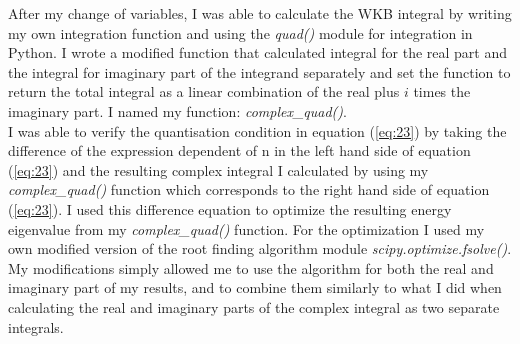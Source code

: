 \documentclass[10pt, a4paper, singlespacing, headsepline]{report}
\begin{document}
After my change of variables, I was able to calculate the WKB integral by writing my own integration function and using the \emph{quad()} module for integration in Python. I wrote a modified function that calculated integral for the real part and the integral for imaginary part of the integrand separately and set the function to return the total integral as a linear combination of the real plus $i$ times the imaginary part. I named my function: \emph{complex\_quad()}.\\
I was able to verify the quantisation condition in equation (\ref{eq:23}) by taking the difference of the expression dependent of n in the left hand side of equation (\ref{eq:23}) and the resulting complex integral I calculated by using my \emph{complex\_quad()} function which corresponds to the right hand side of equation (\ref{eq:23}). I used this difference equation to optimize the resulting energy eigenvalue from my \emph{complex\_quad()} function. For the optimization I used my own modified version of the root finding algorithm module \emph{scipy.optimize.fsolve()}. My modifications simply allowed me to use the algorithm for both the real and imaginary part of my results, and to combine them similarly to what I did when calculating the real and imaginary parts of the complex integral as two separate integrals.
\end{document}
